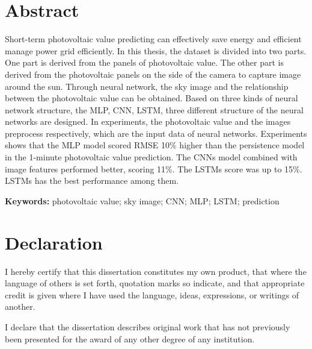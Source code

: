 \documentclass[a4paper,10pt,oneside]{book}
\begin{document}


\frontmatter


\doublespacing

\setlength{\parindent}{0in}
\setlength{\parskip}{10pt} 


\chapter{Abstract}

 Short-term photovoltaic value predicting can effectively save energy and efficient manage power grid efficiently. In this thesis, the dataset is divided into two parts. One part is derived from the panels of photovoltaic value. The other part is derived from the photovoltaic panels on the side of the camera to capture image around the sun. Through  neural network,  the sky image and the relationship between the photovoltaic value can be obtained. Based on three kinds of neural network structure, the MLP, CNN, LSTM,  three different structure of the neural networks are designed. In experiments, the photovoltaic value and the images preprocess respectively, which are the input data of neural networks. Experiments shows that the MLP model scored RMSE 10\% higher than the persistence model  in the 1-minute photovoltaic value prediction. The CNNs model combined with image features performed better, scoring 11\%. The LSTMs score was up to 15\%. LSTMs has the best performance among them.
 


\textbf{Keywords:} photovoltaic value; sky image; CNN; MLP; LSTM; prediction




\chapter{Declaration}

I hereby certify that this dissertation constitutes my own product, that where the language of others is set forth, quotation marks so indicate, and that appropriate credit is given where I have used the language, ideas, expressions, or writings of another.

I declare that the dissertation describes original work that has not previously been presented for the award of any other degree of any institution.
\end{document}
